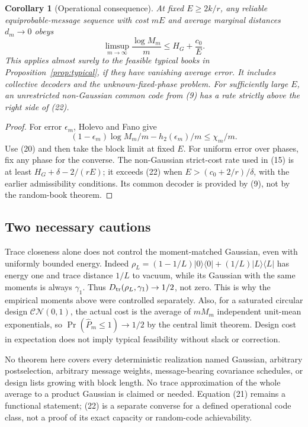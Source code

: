 \documentclass[11pt]{article}
\newtheorem{corollary}[theorem]{Corollary}
\newcommand{\CN}{\mathcal{CN}}
\begin{document}
\begin{corollary}[Operational consequence]\label{cor:operational}
At fixed \(E\geq2k/r\), any reliable equiprobable-message sequence
with cost \(mE\) and average marginal distances \(d_m\to0\) obeys
\[
 \limsup_{m\to\infty}\frac{\log M_m}{m}
 \leq H_G+\frac{c_0}{E}.                                  \tag{22}
\]
This applies almost surely to the feasible typical books in
Proposition~\ref{prop:typical}, if they have vanishing average error.
It includes collective decoders and the unknown-fixed-phase problem.
For sufficiently large \(E\), an unrestricted non-Gaussian common code
from (9) has a rate strictly above the right side of (22).
\end{corollary}
\begin{proof}
For error \(\epsilon_m\), Holevo and Fano give
\[
 (1-\epsilon_m)\log M_m/m-h_2(\epsilon_m)/m\leq\chi_m/m.
\]
Use (20) and then take the block limit at fixed \(E\).
For uniform error over phases, fix any phase for the converse.
The non-Gaussian strict-cost rate used in (15) is at least
\(H_G+\delta-2/(rE)\); it exceeds (22) when
\(E>(c_0+2/r)/\delta\), with the earlier admissibility conditions.
Its common decoder is provided by (9), not by the random-book theorem.
\end{proof}

\subsection{Two necessary cautions}

Trace closeness alone does not control the moment-matched Gaussian,
even with uniformly bounded energy. Indeed
\(\rho_L=(1-1/L)|0\rangle\langle0|+(1/L)|L\rangle\langle L|\)
has energy one and trace distance \(1/L\) to vacuum, while its Gaussian
with the same moments is always \(\gamma_1\).
Thus \(D_{\rm tr}(\rho_L,\gamma_1)\to1/2\), not zero.
This is why the empirical moments above were controlled separately.
Also, for a saturated circular design \(\CN(0,1)\), the actual cost is
the average of \(mM_m\) independent unit-mean exponentials, so
\(\Pr(\widehat P_m\leq1)\to1/2\) by the central limit theorem.
Design cost in expectation does not imply typical feasibility without
slack or correction.

No theorem here covers every deterministic realization named Gaussian,
arbitrary postselection, arbitrary message weights, message-bearing
covariance schedules, or design lists growing with block length.
No trace approximation of the whole average to a product Gaussian is
claimed or needed. Equation (21) remains a functional statement;
(22) is a separate converse for a defined operational code class,
not a proof of its exact capacity or random-code achievability.
\end{document}
